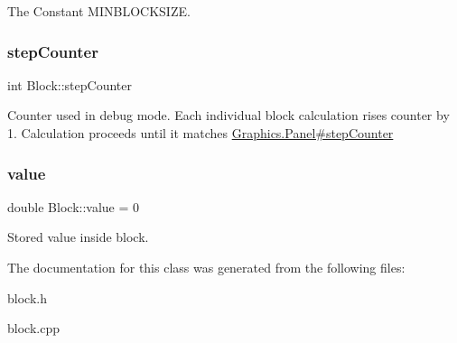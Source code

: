 The Constant M\+I\+N\+B\+L\+O\+C\+K\+S\+I\+ZE. \mbox{\label{classBlock_acf7c29d2194e317f2cc831046ec5460e}} 
\subsubsection{\texorpdfstring{step\+Counter}{stepCounter}}
{\footnotesize\ttfamily int Block\+::step\+Counter\hspace{0.3cm}{\ttfamily [static]}}

Counter used in debug mode. Each individual block calculation rises counter by 1. Calculation proceeds until it matches \hyperlink{}{Graphics.\+Panel\#step\+Counter} \mbox{\label{classBlock_afb64e6479c44387ece15c0f8d635236f}} 
\subsubsection{\texorpdfstring{value}{value}}
{\footnotesize\ttfamily double Block\+::value = 0\hspace{0.3cm}{\ttfamily [private]}}

Stored value inside block. 

The documentation for this class was generated from the following files\+:\begin{DoxyCompactItemize}
\item 
block.\+h\item 
block.\+cpp\end{DoxyCompactItemize}

